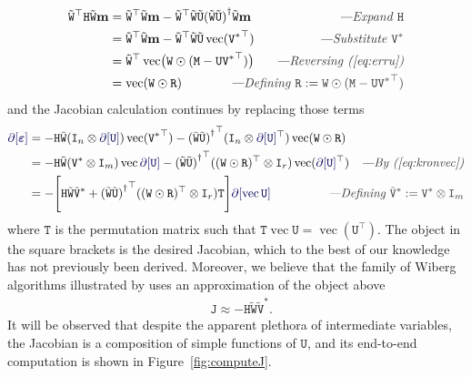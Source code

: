 \documentclass[runningheads]{llncs}
\def\eqref#1{(\ref{eq:#1})}
\def\eqlabel#1{\label{eq:#1}}
\def\tr{^\top}
\def\xcomment#1{\textcolor[gray]{.2}{\text{\em---#1}}}
\def\comment#1{\kern-1cm\xcomment{#1}}
\def\vec{\operatorname{vec}}
\def\hadamard{\odot}
\def\m#1{\ensuremath{\mathtt{#1}}}
\def\v#1{\ensuremath{\mathbf{#1}}}
\def\mU{\m U}
\def\mV{\m V}
\def\mW{\m W}
\def\mM{\m M}
\def\twiddle#1{{\tilde{#1}}}
\def\tU{\twiddle\mU}
\def\tW{\twiddle\mW}
\def\tVstar{{\twiddle\mV}^*}
\begin{document}
\begin{align}
\tW\tr \m H \tW \v m & = \tW\tr\tW \v m - \tW\tr\tW\tU \pinv{(\tW\tU)}\tW \v m & \comment{Expand \m H}\\
& = \tW\tr\tW \v m - \tW\tr\tW\tU \vec(\Vstar\tr) &\comment{Substitute $\Vstar$}\\
& = \tW\tr\vec\bigl(\mW\hadamard(\mM - \mU \Vstar\tr)\bigr) &\comment{Reversing \eqref{erru}}\\
& = \vec (\mW\hadamard\m R) & \comment{Defining $\m R := \mW\hadamard(\mM - \mU \Vstar\tr)$}
\end{align}
and the Jacobian calculation continues by replacing those terms
\def\Ttrans{\m{T}}
\begin{align}
\diff[\verru]
  & = - \m H \tW(\kron{\Id n}{\diff[\mU]}) \vec(\Vstar\tr) -
      \pinv{(\tW\tU)}\tr (\kron{\Id n}{\diff[\mU]\tr}) \vec(\mW\hadamard\m R)
\\& = - \m H \tW(\kron{\Vstar}{\Id m})\vec{\diff[\mU]}  -
      \pinv{(\tW\tU)}\tr (\kron{(\mW\hadamard\m R) \tr}{\Id r})\vec(\diff[\mU]\tr) & \xcomment{By \eqref{kronvec}}
\\& = -\Biggl[\m H \tW \tVstar  +
      \pinv{(\tW\tU)}\tr (\kron{(\mW\hadamard\m R) \tr}{\Id r})\Ttrans
      \Biggl] \diff[\vec\mU] & 
\kern-2cm\comment{Defining $\tVstar:=\kron{\Vstar}{\Id m}$}
\eqlabel{jacobian}
\end{align}
where $\Ttrans$ is the permutation matrix such that $\Ttrans\vec\mU = \vec(\mU\tr)$.   The object in the square brackets is the desired Jacobian, which to the best of our knowledge has not previously been derived. Moreover, we believe that the family of Wiberg algorithms illustrated by \cite{okatani2006wiberg} uses an approximation of the object above
\begin{align}
&\m J \approx - \m H \tW \tVstar.
\end{align}
It will be observed that despite the apparent plethora of intermediate variables, the Jacobian is a composition of simple functions of $\m U$, and its end-to-end computation is shown in Figure~\ref{fig:computeJ}.
\end{document}
